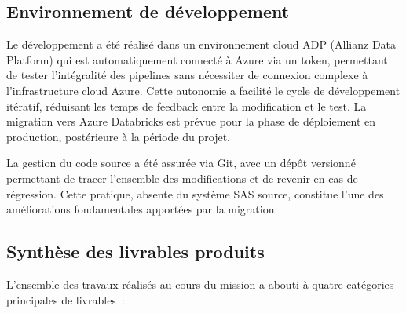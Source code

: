 \subsection{Environnement de développement}

Le développement a été réalisé dans un environnement cloud ADP (Allianz Data Platform) qui est automatiquement connecté à Azure via un token, permettant de tester l'intégralité des pipelines sans nécessiter de connexion complexe à l'infrastructure cloud Azure. Cette autonomie a facilité le cycle de développement itératif, réduisant les temps de feedback entre la modification et le test. La migration vers Azure Databricks est prévue pour la phase de déploiement en production, postérieure à la période du projet.

La gestion du code source a été assurée via Git, avec un dépôt versionné permettant de tracer l'ensemble des modifications et de revenir en cas de régression. Cette pratique, absente du système SAS source, constitue l'une des améliorations fondamentales apportées par la migration.

\enlargethispage{2cm} %
\subsection{Synthèse des livrables produits}

L'ensemble des travaux réalisés au cours du mission a abouti à quatre catégories principales de livrables :


